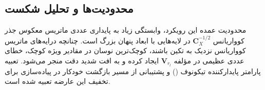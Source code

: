 \subsection{محدودیت‌ها و تحلیل شکست}
محدودیت عمده این رویکرد، وابستگی زیاد به پایداری عددی ماتریس معکوس جذر کوواریانس $\mathbf{C}_X^{-1/2}$ در لایه‌هایی با ابعاد پنهان بزرگ است. چنانچه درایه‌های ماتریس کوواریانس نزدیک به تکین باشند، کوچک‌ترین نوسان در مقادیر ویژه کوچک، خطای عددی عظیمی در مؤلفه $\mathbf{V}_{r_l}$ ایجاد کرده و به افت شدید دقت منجر می‌شود. تعبیه پارامتر پایدارکننده تیکونوف () و پشتیبانی از مسیر بازگشت خودکار در پیاده‌سازی برای تخفیف این عارضه تعبیه شده است.
